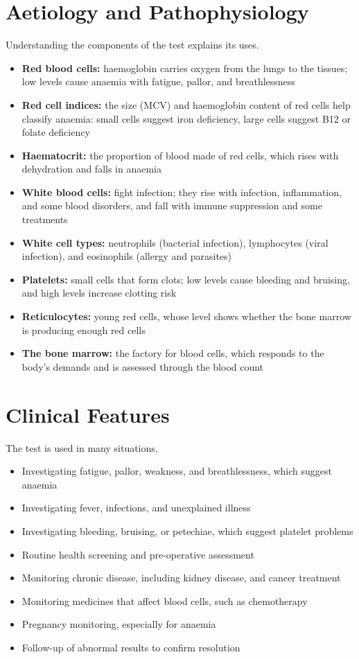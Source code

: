 \section*{Aetiology and Pathophysiology}
Understanding the components of the test explains its uses.
\begin{itemize}
    \item \textbf{Red blood cells:} haemoglobin carries oxygen from the lungs to the tissues; low levels cause anaemia with fatigue, pallor, and breathlessness
    \item \textbf{Red cell indices:} the size (MCV) and haemoglobin content of red cells help classify anaemia: small cells suggest iron deficiency, large cells suggest B12 or folate deficiency
    \item \textbf{Haematocrit:} the proportion of blood made of red cells, which rises with dehydration and falls in anaemia
    \item \textbf{White blood cells:} fight infection; they rise with infection, inflammation, and some blood disorders, and fall with immune suppression and some treatments
    \item \textbf{White cell types:} neutrophils (bacterial infection), lymphocytes (viral infection), and eosinophils (allergy and parasites)
    \item \textbf{Platelets:} small cells that form clots; low levels cause bleeding and bruising, and high levels increase clotting risk
    \item \textbf{Reticulocytes:} young red cells, whose level shows whether the bone marrow is producing enough red cells
    \item \textbf{The bone marrow:} the factory for blood cells, which responds to the body's demands and is assessed through the blood count
\end{itemize}

\section*{Clinical Features}
The test is used in many situations.
\begin{itemize}
    \item Investigating fatigue, pallor, weakness, and breathlessness, which suggest anaemia
    \item Investigating fever, infections, and unexplained illness
    \item Investigating bleeding, bruising, or petechiae, which suggest platelet problems
    \item Routine health screening and pre-operative assessment
    \item Monitoring chronic disease, including kidney disease, and cancer treatment
    \item Monitoring medicines that affect blood cells, such as chemotherapy
    \item Pregnancy monitoring, especially for anaemia
    \item Follow-up of abnormal results to confirm resolution
\end{itemize}

